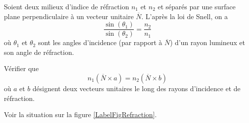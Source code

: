 
\begin{exercice}\label{exoOutilsMath-0076}

    Soient deux milieux d'indice de réfraction $n_1$ et $n_2$ et séparés par une surface plane perpendiculaire à un vecteur unitaire $\overline{ N }$. L'après la loi de Snell, on a 
    \begin{equation}
        \frac{ \sin(\theta_1) }{ \sin(\theta_2) }=\frac{ n_2 }{ n_1 }
    \end{equation}
    où $\theta_1$ et $\theta_2$ sont les angles d'incidence (par rapport à $\overline{ N }$) d'un rayon lumineux et son angle de réfraction.

    Vérifier que
    \begin{equation}
        n_1(\overline{ N }\times a)=n_2(\overline{ N }\times b)
    \end{equation}
    où $a$ et $b$ désignent deux vecteurs unitaires le long des rayons d'incidence et de réfraction.


    Voir la situation sur la figure \ref{LabelFigRefraction}.
\newcommand{\CaptionFigRefraction}{Angles de réfraction et de réflexion.}


\end{exercice}
